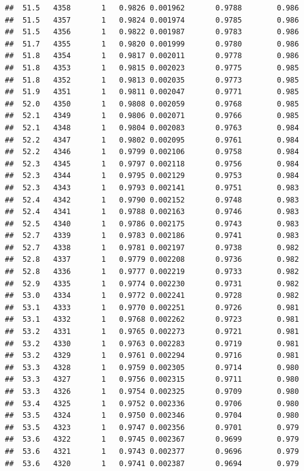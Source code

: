 \documentclass[
]{book}
\begin{document}
\begin{verbatim}
##  51.5   4358       1   0.9826 0.001962       0.9788        0.986
##  51.5   4357       1   0.9824 0.001974       0.9785        0.986
##  51.5   4356       1   0.9822 0.001987       0.9783        0.986
##  51.7   4355       1   0.9820 0.001999       0.9780        0.986
##  51.8   4354       1   0.9817 0.002011       0.9778        0.986
##  51.8   4353       1   0.9815 0.002023       0.9775        0.985
##  51.8   4352       1   0.9813 0.002035       0.9773        0.985
##  51.9   4351       1   0.9811 0.002047       0.9771        0.985
##  52.0   4350       1   0.9808 0.002059       0.9768        0.985
##  52.1   4349       1   0.9806 0.002071       0.9766        0.985
##  52.1   4348       1   0.9804 0.002083       0.9763        0.984
##  52.2   4347       1   0.9802 0.002095       0.9761        0.984
##  52.2   4346       1   0.9799 0.002106       0.9758        0.984
##  52.3   4345       1   0.9797 0.002118       0.9756        0.984
##  52.3   4344       1   0.9795 0.002129       0.9753        0.984
##  52.3   4343       1   0.9793 0.002141       0.9751        0.983
##  52.4   4342       1   0.9790 0.002152       0.9748        0.983
##  52.4   4341       1   0.9788 0.002163       0.9746        0.983
##  52.5   4340       1   0.9786 0.002175       0.9743        0.983
##  52.7   4339       1   0.9783 0.002186       0.9741        0.983
##  52.7   4338       1   0.9781 0.002197       0.9738        0.982
##  52.8   4337       1   0.9779 0.002208       0.9736        0.982
##  52.8   4336       1   0.9777 0.002219       0.9733        0.982
##  52.9   4335       1   0.9774 0.002230       0.9731        0.982
##  53.0   4334       1   0.9772 0.002241       0.9728        0.982
##  53.1   4333       1   0.9770 0.002251       0.9726        0.981
##  53.1   4332       1   0.9768 0.002262       0.9723        0.981
##  53.2   4331       1   0.9765 0.002273       0.9721        0.981
##  53.2   4330       1   0.9763 0.002283       0.9719        0.981
##  53.2   4329       1   0.9761 0.002294       0.9716        0.981
##  53.3   4328       1   0.9759 0.002305       0.9714        0.980
##  53.3   4327       1   0.9756 0.002315       0.9711        0.980
##  53.3   4326       1   0.9754 0.002325       0.9709        0.980
##  53.4   4325       1   0.9752 0.002336       0.9706        0.980
##  53.5   4324       1   0.9750 0.002346       0.9704        0.980
##  53.5   4323       1   0.9747 0.002356       0.9701        0.979
##  53.6   4322       1   0.9745 0.002367       0.9699        0.979
##  53.6   4321       1   0.9743 0.002377       0.9696        0.979
##  53.6   4320       1   0.9741 0.002387       0.9694        0.979

\end{verbatim}
\end{document}
